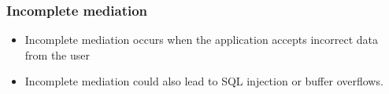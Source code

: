 \documentclass[twoside]{article}
\begin{document}
\subsubsection{Incomplete mediation  }
\begin{itemize}
\item Incomplete mediation occurs when the application accepts incorrect data from the user
\item Incomplete mediation could also lead to SQL injection or buffer overflows. 
\end{itemize}
\end{document}

